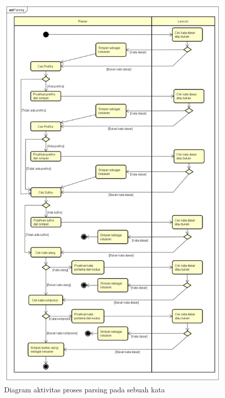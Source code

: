 \begin{figure}[H]
\centering
\includegraphics[scale=0.4]{Gambar/gambar-diagram-aktivitas-satu-kata}
\caption{Diagram aktivitas proses parsing pada sebuah kata} 
\label{gambar-diagram-aktivitas-satu-kata}
\end{figure}

%
